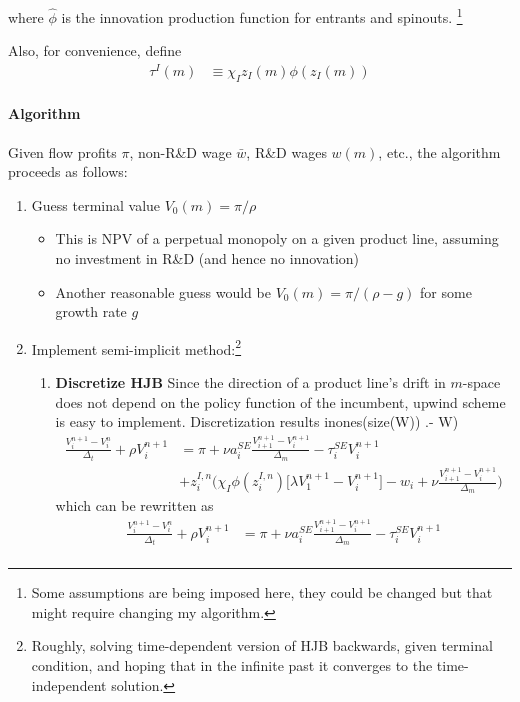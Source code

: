 \documentclass[12pt,english]{article}
\theoremstyle{remark}
\begin{document}
where $\hat{\phi}$ is the innovation production function for entrants and spinouts. \footnote{Some assumptions are being imposed here, they could be changed but that might require changing my algorithm.} 

Also, for convenience, define
\begin{align*}
	\tau^I(m) &\equiv \chi_I z_I(m) \phi (z_I(m))
\end{align*}

\paragraph{Algorithm} Given flow profits $\pi$, non-R\&D wage $\bar{w}$, R\&D wages $w(m)$, etc., the algorithm proceeds as follows:

\begin{enumerate}
	\item Guess terminal value $V_0(m) = \pi / \rho$
	\begin{itemize}
		\item This is NPV of a perpetual monopoly on a given product line, assuming no investment in R\&D (and hence no innovation)
		\item Another reasonable guess would be $V_0(m) = \pi / (\rho - g)$ for some growth rate $g$
	\end{itemize}
	\item Implement semi-implicit method:\footnote{Roughly, solving time-dependent version of HJB backwards, given terminal condition, and hoping that in the infinite past it converges to the time-independent solution.}
	\begin{enumerate}
		\item \textbf{Discretize HJB} Since the direction of a product line's drift in $m$-space does not depend on the policy function of the incumbent, upwind scheme is easy to implement. Discretization results inones(size(W)) .- W)
		\begin{align*}
			\frac{V_i^{n+1} - V_i^{n}}{\Delta_t} + \rho V_i^{n+1} &= \pi + \nu a_i^{SE} \frac{V_{i+1}^{n+1} - V_i^{n+1}}{\Delta_m} - \tau^{SE}_i V_i^{n+1} \\
			          &+ z^{I,n}_i \Big( \chi_I \phi(z^{I,n}_i) \big[ \lambda V^{n+1}_1 - V^{n+1}_i \big] - w_i + \nu \frac{V_{i+1}^{n+1} - V_i^{n+1}}{\Delta_m} \Big)
		\end{align*}
		which can be rewritten as 
		\begin{align*}
			\frac{V_i^{n+1} - V_i^{n}}{\Delta_t} + \rho V_i^{n+1} &= \pi + \nu a_i^{SE} \frac{V_{i+1}^{n+1} - V_i^{n+1}}{\Delta_m} - \tau^{SE}_i V_i^{n+1} \\

\end{align*}
\end{enumerate}
\end{enumerate}
\end{document}
